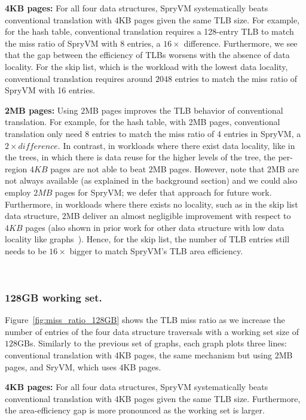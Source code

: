 \noindent\textbf{4KB pages:} For all four data structures, SpryVM
systematically beats conventional translation with $4$KB pages given
the same TLB size. For example, for the hash table, conventional
translation requires a 128-entry TLB to match the miss ratio of SpryVM
with 8 entries, a $16\times$ difference. Furthermore, we see that the
gap between the efficiency of TLBs worsens with the absence of data
locality. For the skip list, which is the workload with the lowest
data locality, conventional translation requires around $2048$ entries
to match the miss ratio of SpryVM with 16 entries.

\noindent\textbf{2MB pages:} Using $2$MB pages improves the TLB
behavior of conventional translation. For example, for the hash table,
with 2MB pages, conventional translation only need 8 entries to match
the miss ratio of 4 entries in SpryVM, a $2\times difference$. In
contrast, in workloads where there exist data locality, like in the
trees, in which there is data reuse for the higher levels of the tree,
the per-region $4KB$ pages are not able to beat $2$MB pages. However,
note that $2$MB are not always available (as explained in the
background section) and we could also employ $2MB$ pages for SpryVM;
we defer that approach for future work. Furthermore, in workloads
where there exists no locality, such as in the skip list data
structure, $2$MB deliver an almost negligible improvement with respect
to $4KB$ pages (also shown in prior work for other data structure with
low data locality like graphs~\cite{haria:devirtualizing}). Hence, for
the skip list, the number of TLB entries still needs to be $16\times$
bigger to match SpryVM's TLB area efficiency.

~\subsubsection{128GB working set.} Figure~\ref{fig:miss_ratio_128GB}
shows the TLB miss ratio as we increase the number of entries of the
four data structure traversals with a working set size of
$128$GBs. Similarly to the previous set of graphs, each graph plots
three lines: conventional translation with 4KB pages, the same
mechanism but using $2$MB pages, and SryVM, which uses $4$KB pages.

\noindent\textbf{4KB pages:} For all four data structures, SpryVM
systematically beats conventional translation with $4$KB pages given
the same TLB size. Furthermore, the area-efficiency gap is more
pronounced as the working set is larger.

